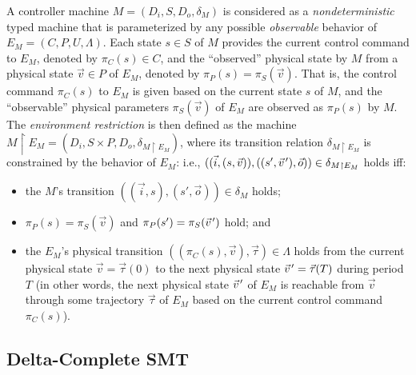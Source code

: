 \documentclass{sig-alternate}
\newcommand{\pvec}[1]{\vec{#1}\mkern2mu\vphantom{#1}} %
\begin{document}
A controller machine $M = (D_i, S, D_o,\delta_{M})$ is considered as 
a \emph{nondeterministic} typed
machine that is
parameterized  by any possible \emph{observable}
behavior of %
$E_M  = (C, P, U, \Lambda)$.
Each state $s \in S$ of $M$ provides
the current control command %
to $E_M$,
denoted by $\pi_C(s) \in C$, and
the ``observed'' physical state by $M$
from a physical state  $\vec{v} \in P$ of $E_M$,
denoted by $\pi_P(s) = \pi_S(\vec{v})$.
%
That is,
the control command $\pi_C(s)$ to $E_M$ is given based on the current state $s$ of $M$,
and
the ``observable'' physical parameters $\pi_S(\vec{v})$ of $E_M$ 
are observed as $\pi_P(s)$ by $M$.
%
The \emph{environment restriction} %
is then defined as the machine
$M \restriction E_M = (D_i, S \times P, D_o, \delta_{M \restriction E_M})$,
where 
its transition relation 
$\delta_{M \restriction E_M}$ is constrained by the behavior of $E_M$: i.e.,
%
$((\vec{i}, (s,\vec{v})), ((s',\pvec{v}'), \vec{o}) ) \in \delta_{M \restriction E_M}$ holds
iff:

\begin{itemize}
	\item the $M$'s transition $( (\vec{i}, s), (s', \vec{o}) ) \in \delta_{M}$ holds;
	\item $\pi_P(s) = \pi_S(\vec{v})$ and $\pi_P(s') = \pi_S(\pvec{v}')$ hold; and
	\item the $E_M$'s physical transition 
	$((\pi_C(s), \vec{v}),  \vec{\tau} ) \in \Lambda$
	holds 
	from the current physical state $\vec{v} = \vec{\tau}(0)$ 
	to the next physical state $\pvec{v}' = \vec{\tau}(T)$ during period $T$
	(in other words, the next physical state $\pvec{v}'$ of $E_M$ is 
	reachable from $\vec{v}$  through some trajectory $\vec{\tau}$
	of  $E_M$ based on the current control command $\pi_C(s)$).
\end{itemize}










\subsection{Delta-Complete SMT}
\end{document}
